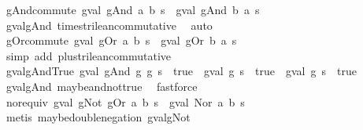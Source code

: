 \begin{isabellebody}
\ gAnd{\isacharunderscore}commute{\isacharcolon}\ {\isachardoublequoteopen}gval\ {\isacharparenleft}gAnd\ a\ b{\isacharparenright}\ s\ {\isacharequal}\ gval\ {\isacharparenleft}gAnd\ b\ a{\isacharparenright}\ s{\isachardoublequoteclose}\isanewline
%
\isadelimproof
\ \ %
\endisadelimproof
%
\isatagproof
{}\isamarkupfalse%
\ gval{\isacharunderscore}gAnd\ times{\isacharunderscore}trilean{\isacharunderscore}commutative\ \isamarkupfalse%
\ auto%
\endisatagproof
{\isafoldproof}%
%
\isadelimproof
\isanewline
%
\endisadelimproof
\isanewline
{}\isamarkupfalse%
\ gOr{\isacharunderscore}commute{\isacharcolon}\ {\isachardoublequoteopen}gval\ {\isacharparenleft}gOr\ a\ b{\isacharparenright}\ s\ {\isacharequal}\ gval\ {\isacharparenleft}gOr\ b\ a{\isacharparenright}\ s{\isachardoublequoteclose}\isanewline
%
\isadelimproof
\ \ %
\endisadelimproof
%
\isatagproof
{}\isamarkupfalse%
\ {\isacharparenleft}simp\ add{\isacharcolon}\ plus{\isacharunderscore}trilean{\isacharunderscore}commutative{\isacharparenright}%
\endisatagproof
{\isafoldproof}%
%
\isadelimproof
\isanewline
%
\endisadelimproof
\isanewline
{}\isamarkupfalse%
\ gval{\isacharunderscore}gAnd{\isacharunderscore}True{\isacharcolon}\ {\isachardoublequoteopen}{\isacharparenleft}gval\ {\isacharparenleft}gAnd\ g{}\ g{}{\isacharparenright}\ s\ {\isacharequal}\ true{\isacharparenright}\ {\isacharequal}\ {\isacharparenleft}{\isacharparenleft}gval\ g{}\ s\ {\isacharequal}\ true{\isacharparenright}\ {\isasymand}\ gval\ g{}\ s\ {\isacharequal}\ true{\isacharparenright}{\isachardoublequoteclose}\isanewline
%
\isadelimproof
\ \ %
\endisadelimproof
%
\isatagproof
{}\isamarkupfalse%
\ gval{\isacharunderscore}gAnd\ maybe{\isacharunderscore}and{\isacharunderscore}not{\isacharunderscore}true\ \isamarkupfalse%
\ fastforce%
\endisatagproof
{\isafoldproof}%
%
\isadelimproof
\isanewline
%
\endisadelimproof
\isanewline
{}\isamarkupfalse%
\ nor{\isacharunderscore}equiv{\isacharcolon}\ {\isachardoublequoteopen}gval\ {\isacharparenleft}gNot\ {\isacharparenleft}gOr\ a\ b{\isacharparenright}{\isacharparenright}\ s\ {\isacharequal}\ gval\ {\isacharparenleft}Nor\ a\ b{\isacharparenright}\ s{\isachardoublequoteclose}\isanewline
%
\isadelimproof
\ \ %
\endisadelimproof
%
\isatagproof
{}\isamarkupfalse%
\ {\isacharparenleft}metis\ maybe{\isacharunderscore}double{\isacharunderscore}negation\ gval{\isacharunderscore}gNot{\isacharparenright}%
\endisatagproof
{\isafoldproof}%

\end{isabellebody}
